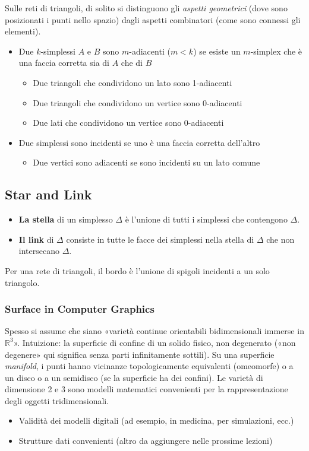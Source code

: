Sulle reti di triangoli, di solito si distinguono gli \textit{aspetti geometrici} (dove sono posizionati i punti nello spazio) dagli aspetti combinatori (come sono connessi gli elementi).
\begin{itemize}
    \item Due $k$-simplessi $A$ e $B$ sono $m$-adiacenti ($m<k$) se esiste un $m$-simplex che è una faccia corretta sia di $A$ che di $B$
    \begin{itemize}
        \item Due triangoli che condividono un lato sono 1-adiacenti
        \item Due triangoli che condividono un vertice sono 0-adiacenti
        \item Due lati che condividono un vertice sono 0-adiacenti
    \end{itemize}
    \item Due simplessi sono incidenti se uno è una faccia corretta dell'altro
    \begin{itemize}
        \item Due vertici sono adiacenti se sono incidenti su un lato comune
    \end{itemize}
\end{itemize}
\subsection{Star and Link}
\begin{itemize}
    \item \textbf{La stella} di un simplesso $\Delta$ è l'unione di tutti i simplessi che contengono $\Delta$.
    \item \textbf{Il link} di $\Delta$ consiste in tutte le facce dei simplessi nella stella di $\Delta$ che non intersecano $\Delta$.
\end{itemize}
Per una rete di triangoli, il bordo è l'unione di spigoli incidenti a un solo triangolo.
\subsubsection{Surface in Computer Graphics}
Spesso si assume che siano «varietà continue orientabili bidimensionali immerse in $\mathbb{R}^3$».
Intuizione: la superficie di confine di un solido fisico, non degenerato («non degenere» qui significa senza parti infinitamente sottili).
Su una superficie \textit{manifold}, i punti hanno vicinanze topologicamente equivalenti (omeomorfe) o a un disco o a un semidisco (se la superficie ha dei confini).
Le varietà di dimensione 2 e 3 sono modelli matematici convenienti per la rappresentazione degli oggetti tridimensionali.
\begin{itemize}
    \item Validità dei modelli digitali (ad esempio, in medicina, per simulazioni, ecc.)
    \item Strutture dati convenienti (altro da aggiungere nelle prossime lezioni)
\end{itemize}
